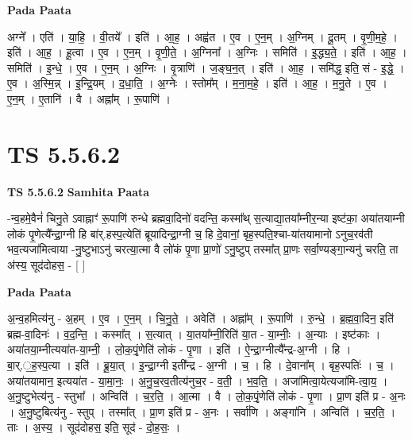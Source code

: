 \documentclass[17pt]{extarticle}
\begin{document}
\textbf{Pada Paata} \newline

अग्ने᳚ । एति॑ । या॒हि॒ । वी॒तये᳚ । इति॑ । आ॒ह॒ । अह्व॑त । ए॒व । ए॒न॒म् । अ॒ग्निम् । दू॒तम् । वृ॒णी॒म॒हे॒ । इति॑ । आ॒ह॒ । हू॒त्वा । ए॒व । ए॒न॒म् । वृ॒णी॒ते॒ । अ॒ग्निना᳚ । अ॒ग्निः । समिति॑ । इ॒द्ध्य॒ते॒ । इति॑ । आ॒ह॒ । समिति॑ । इ॒न्धे॒ । ए॒व । ए॒न॒म् । अ॒ग्निः । वृ॒त्राणि॑ । ज॒ङ्घ॒न॒त् । इति॑ । आ॒ह॒ । समि॑द्ध॒ इति॒ सं - इ॒द्धे॒ । ए॒व । अ॒स्मि॒न्न् । इ॒न्द्रि॒यम् । द॒धा॒ति॒ । अ॒ग्नेः । स्तोम᳚म् । म॒ना॒म॒हे॒ । इति॑ । आ॒ह॒ । म॒नु॒ते । ए॒व । ए॒न॒म् । ए॒तानि॑ । वै । अह्ना᳚म् । रू॒पाणि॑ ।  \newline





\section{ TS 5.5.6.2 }

\textbf{TS 5.5.6.2 } \newline
\textbf{Samhita Paata} \newline

-न्व॒हमे॒वैनं॑ चिनु॒ते ऽवाह्नाꣳ॑ रू॒पाणि॑ रुन्धे ब्रह्मवा॒दिनो॑ वदन्ति॒ कस्मा᳚थ् स॒त्याद्या॒तया᳚म्नीर॒न्या इष्ट॑का॒ अया॑तयाम्नी लोकं पृ॒णेत्यै᳚न्द्रा॒ग्नी हि बा॑र्.हस्प॒त्येति॑ ब्रूयादिन्द्रा॒ग्नी च॒ हि दे॒वानां॒ बृह॒स्पति॒श्चा-या॑तयामानो ऽनुच॒रव॑ती भव॒त्यजा॑मित्वाया -नु॒ष्टुभाऽनु॑ चरत्या॒त्मा वै लो॑कं पृ॒णा प्रा॒णो॑ ऽनु॒ष्टुप् तस्मा᳚त् प्रा॒णः सर्वा॒ण्यङ्गा॒न्यनु॑ चरति॒ ता अ॑स्य॒ सूद॑दोहस॒ - [  ] \newline

\textbf{Pada Paata} \newline

अ॒न्व॒हमित्य॑नु - अ॒हम् । ए॒व । ए॒न॒म् । चि॒नु॒ते॒ । अवेति॑ । अह्ना᳚म् । रू॒पाणि॑ । रु॒न्धे॒ । ब्र॒ह्म॒वा॒दिन॒ इति॑ ब्रह्म-वा॒दिनः॑ । व॒द॒न्ति॒ । कस्मा᳚त् । स॒त्यात् । या॒तया᳚म्नी॒रिति॑ या॒त - या॒म्नीः॒ । अ॒न्याः । इष्ट॑काः । अया॑तया॒म्नीत्यया॑त-या॒म्नी॒ । लो॒क॒पृं॒णेति॑ लोकं - पृ॒णा । इति॑ । ऐ॒न्द्रा॒ग्नीत्यै᳚न्द्र-अ॒ग्नी । हि । बा॒र्.॒ह॒स्प॒त्या । इति॑ । ब्रू॒या॒त् । इ॒न्द्रा॒ग्नी इती᳚न्द्र - अ॒ग्नी । च॒ । हि । दे॒वाना᳚म् । बृह॒स्पतिः॑ । च॒ । अया॑तयामान॒ इत्यया॑त - या॒मा॒नः॒ । अ॒नु॒च॒रव॒तीत्य॑नुच॒र - व॒ती॒ । भ॒व॒ति॒ । अजा॑मित्वा॒येत्यजा॑मि-त्वा॒य॒ । अ॒नु॒ष्टुभेत्य॑नु - स्तुभा᳚ । अन्विति॑ । च॒र॒ति॒ । आ॒त्मा । वै । लो॒क॒पृं॒णेति॑ लोकं - पृ॒णा । प्रा॒ण इति॑ प्र - अ॒नः । अ॒नु॒ष्टुबित्य॑नु - स्तुप् । तस्मा᳚त् । प्रा॒ण इति॑ प्र - अ॒नः । सर्वा॑णि । अङ्गा॑नि । अन्विति॑ । च॒र॒ति॒ । ताः । अ॒स्य॒ । सूद॑दोहस॒ इति॒ सूद॑ - दो॒ह॒सः॒ ।  \newline
\end{document}
